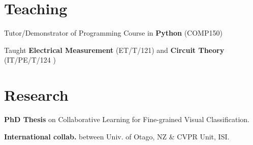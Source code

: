 \documentclass[letterpaper]{tap-resume}
\begin{document}
\begin{minipage}[t]{0.66\textwidth}
\sectionspace



\section{Teaching}



\begin{tightitemize}
\item Tutor/Demonstrator of Programming Course in \textbf{Python} (COMP150)
\end{tightitemize}

\sectionspace 


\begin{tightitemize}
\item Taught \textbf{Electrical Measurement} (ET/T/121) and \textbf{Circuit Theory} (IT/PE/T/124 )
\end{tightitemize}

\sectionspace 


\section{Research}


\begin{tightitemize}
\item \textbf{PhD Thesis} on Collaborative Learning for Fine-grained Visual Classification.
\item \textbf{International collab.} between Univ. of Otago, NZ \& CVPR Unit, ISI.
\end{tightitemize}

\sectionspace 





\end{minipage}
\end{document}
